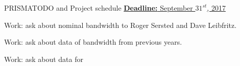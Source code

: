 \begin{frame}{PRISMA}{TODO and Project schedule} 
\underline{\textbf{Deadline:} September $31^{st}$, 2017} 
\begin{enumerate}

\ptask Work: ask about nominal bandwidth to Roger Sersted and Dave Leibfritz. 

\ptask Work: ask about data of bandwidth from previous years. 

\ptask Work: ask about data for 

\end{enumerate} 

\end{frame} 
